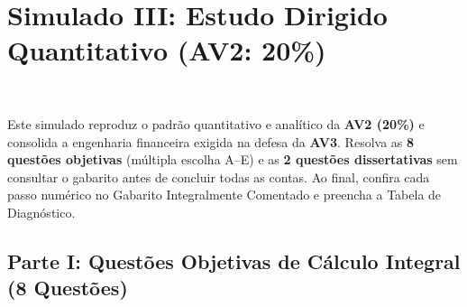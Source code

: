 \clearpage
{}
{}
\chapter*{Simulado III: Estudo Dirigido Quantitativo (AV2: 20\%)}

\noindent{}\ \tagQuant\ \tagTerritorio
\vspace{6pt}

\begin{tcolorbox}[colback=bgSoft, colframe=etIndigo, boxrule=0.8pt, arc=3pt, title={\bfseries INSTRUÇÕES DE APLICAÇÃO E RESOLUÇÃO}, coltitle=white, colbacktitle=etIndigo]
Este simulado reproduz o padrão quantitativo e analítico da \textbf{AV2 (20\%)} e consolida a engenharia financeira exigida na defesa da \textbf{AV3}. Resolva as \textbf{8 questões objetivas} (múltipla escolha A--E) e as \textbf{2 questões dissertativas} sem consultar o gabarito antes de concluir todas as contas. Ao final, confira cada passo numérico no Gabarito Integralmente Comentado e preencha a Tabela de Diagnóstico.
\end{tcolorbox}

\section*{Parte I: Questões Objetivas de Cálculo Integral (8 Questões)}

